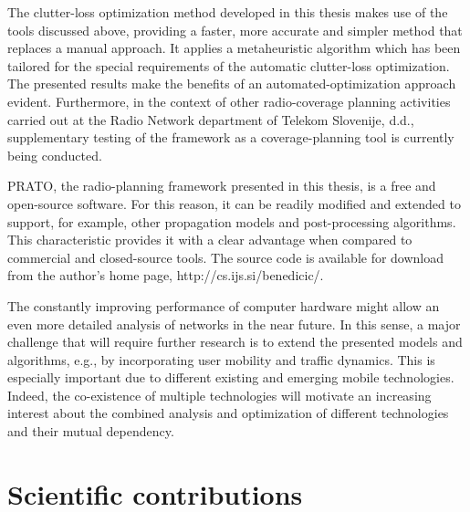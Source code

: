 The clutter-loss optimization method developed in this thesis makes
use of the tools discussed above, providing a faster, more accurate
and simpler method that replaces a manual approach. It applies a metaheuristic
algorithm which has been tailored for the special requirements of
the automatic clutter-loss optimization. The presented results make
the benefits of an automated-optimization approach evident. Furthermore,
in the context of other radio-coverage planning activities carried
out at the Radio Network department of Telekom Slovenije, d.d., supplementary
testing of the framework as a coverage-planning tool is currently
being conducted.

PRATO, the radio-planning framework presented in this thesis, is a
free and open-source software. For this reason, it can be readily
modified and extended to support, for example, other propagation models
and post-processing algorithms. This characteristic provides it with
a clear advantage when compared to commercial and closed-source tools.
The source code is available for download from the author's home page,
http://cs.ijs.si/benedicic/.

The constantly improving performance of computer hardware might allow
an even more detailed analysis of networks in the near future. In
this sense, a major challenge that will require further research is
to extend the presented models and algorithms, e.g., by incorporating
user mobility and traffic dynamics. This is especially important due
to different existing and emerging mobile technologies. Indeed, the
co-existence of multiple technologies will motivate an increasing
interest about the combined analysis and optimization of different
technologies and their mutual dependency.


\section{Scientific contributions}

